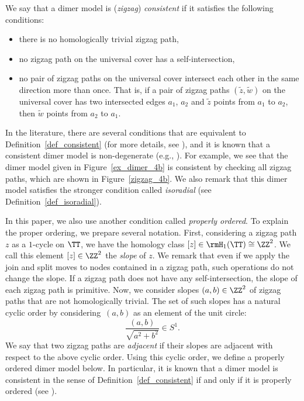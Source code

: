 \begin{Definition}
\label{def_consistent}
We say that a dimer model is (\emph{zigzag}) \emph{consistent} if it satisfies the following conditions:
\begin{itemize}\itemsep=0pt
\item [(1)] there is no homologically trivial zigzag path,
\item [(2)] no zigzag path on the universal cover has a self-intersection,
\item [(3)] no pair of zigzag paths on the universal cover intersect each other in the same direction more than once.
That is, if a pair of zigzag paths $(\widetilde{z},\widetilde{w})$ on the universal cover has two intersected edges $a_1$, $a_2$
and $\widetilde{z}$ points from $a_1$ to $a_2$, then $\widetilde{w}$ points from $a_2$ to $a_1$.
\end{itemize}
\end{Definition}

In the literature, there are several conditions that are equivalent to Definition~\ref{def_consistent} (for more details, see \cite{Boc1,IU1}),
and it is known that a consistent dimer model is non-degenerate (e.g., \cite[Proposition~8.1]{IU2}).
For example, we see that the dimer model given in Figure~\ref{ex_dimer_4b} is consistent by checking all zigzag paths, which are shown in Figure~\ref{zigzag_4b}.
We also remark that this dimer model satisfies the stronger condition called \emph{isoradial} (see Definition~\ref{def_isoradial}).

In this paper, we also use another condition called \emph{properly ordered}.
To explain the proper ordering, we prepare several notation.
First, considering a zigzag path $z$ as a $1$-cycle on $\TT$, we have the homology class $[z]\in\rmH_1(\TT)\cong\ZZ^2$. We call this element $[z]\in\ZZ^2$ the \emph{slope} of $z$.
We remark that even if we apply the join and split moves to nodes contained in a zigzag path, such operations do not change the slope.
If a zigzag path does not have any self-intersection, the slope of each zigzag path is primitive.
Now, we consider slopes $(a,b)\in\ZZ^2$ of zigzag paths that are not homologically trivial.
The set of such slopes has a natural cyclic order by considering~$(a,b)$ as an element of the unit circle:
\begin{displaymath}
\frac{(a,b)}{\sqrt{a^2+b^2}}\in S^1.
\end{displaymath}
We say that two zigzag paths are \emph{adjacent} if their slopes are adjacent with respect to the above cyclic order.
Using this cyclic order, we define a properly ordered dimer model below.
In particular, it is known that a dimer model is consistent in the sense of Definition~\ref{def_consistent} if and only if it is properly ordered (see \cite[Proposition~4.4]{IU1}).

